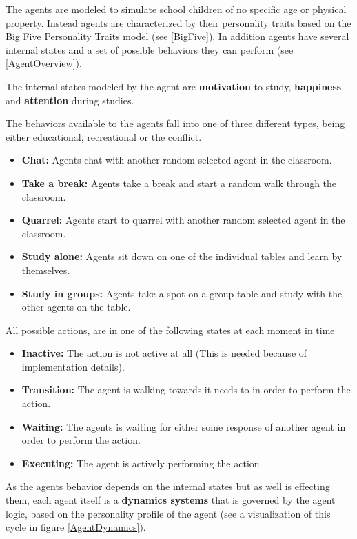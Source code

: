 The agents are modeled to simulate school children of no specific age or physical
property. Instead agents are characterized by their personality traits based on 
the Big Five Personality Traits model (see \ref{BigFive}). In addition agents have
several internal states and a set of possible behaviors they can perform (see \ref{AgentOverview}).

The internal states modeled by the agent are \textbf{motivation} to study, \textbf{happiness}
and \textbf{attention} during studies.

The behaviors available to the agents fall into one of three different types, being
either educational, recreational or the conflict.

\begin{itemize}
    \item \textbf{Chat:} Agents chat with another random selected agent in the classroom.
    \item \textbf{Take a break:} Agents take a break and start a random walk through the classroom.
    \item \textbf{Quarrel:} Agents start to quarrel with another random selected agent in the classroom.
    \item \textbf{Study alone:} Agents sit down on one of the individual tables and learn by themselves.
    \item \textbf{Study in groups:} Agents take a spot on a group table and study with the other agents on the table.
\end{itemize}

All possible actions, are in one of the following states at each moment in time

\begin{itemize}
    \item \textbf{Inactive:} The action is not active at all (This is needed because of implementation details). 
    \item \textbf{Transition:} The agent is walking towards it needs to in order to perform the action.
    \item \textbf{Waiting:} The agents is waiting for either some response of another agent in order to perform the action.
    \item \textbf{Executing:} The agent is actively performing the action.
\end{itemize}

As the agents behavior depends on the internal states but as well is effecting them,
each agent itself is a \textbf{dynamics systems} that is governed by the agent logic, based
on the personality profile of the agent (see a visualization of this cycle in figure \ref{AgentDynamics}).

